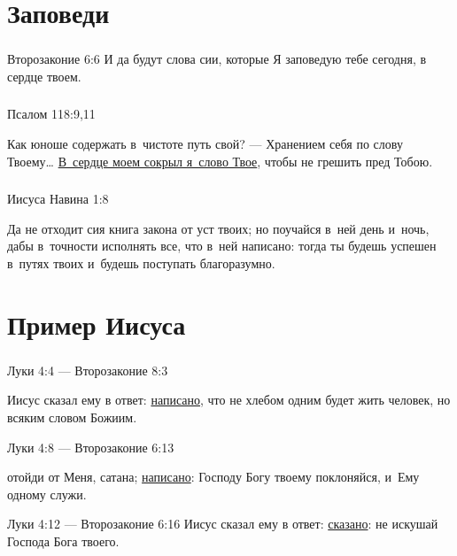 \documentclass[t,aspectratio=169]{beamer} %
\def\hy#1{\parbox{\linewidth}{#1}} %
\begin{document}
\section{Заповеди}
\begin{frame}
	\frametitle{\insertsection}

	\begin{block}{Второзаконие 6:6}
	И да будут слова сии, которые Я заповедую тебе сегодня, в сердце твоем. 
	\end{block}

\end{frame}  
\begin{frame}
	\frametitle{\insertsection}


	\begin{block}{Псалом 118:9,11}
	\hy{Как юноше содержать в~чистоте путь свой? --- Хранением себя по слову Твоему\ldots{} 
	\underline{В~сердце моем сокрыл я~слово Твое}, чтобы не грешить пред Тобою. }
	\end{block}	

\end{frame}  
\begin{frame}
	\frametitle{\insertsection}

	\begin{block}{Иисуса Навина 1:8}
		\hy{Да не отходит сия книга закона от уст твоих; но поучайся в~ней день и~ночь, дабы в~точности исполнять все, что в~ней написано: тогда ты будешь успешен в~путях твоих и~будешь поступать благоразумно.}
	\end{block}
\end{frame}  
\section{Пример Иисуса}
\begin{frame}
	\frametitle{\insertsection}

\begin{block}{Луки 4:4 --- Второзаконие 8:3}
\hy{Иисус сказал ему в ответ: \underline{написано}, что не хлебом одним будет жить человек, но всяким словом Божиим. }
\end{block}

\begin{block}{Луки 4:8 --- Второзаконие 6:13}
	\hy{отойди от Меня, сатана; \underline{написано}: Господу Богу твоему поклоняйся, и~Ему одному служи. }
\end{block}

\begin{block}{Луки 4:12 --- Второзаконие 6:16}
Иисус сказал ему в ответ: \underline{сказано}: не искушай Господа Бога твоего. 
\end{block}

\end{frame}    
\end{document}
